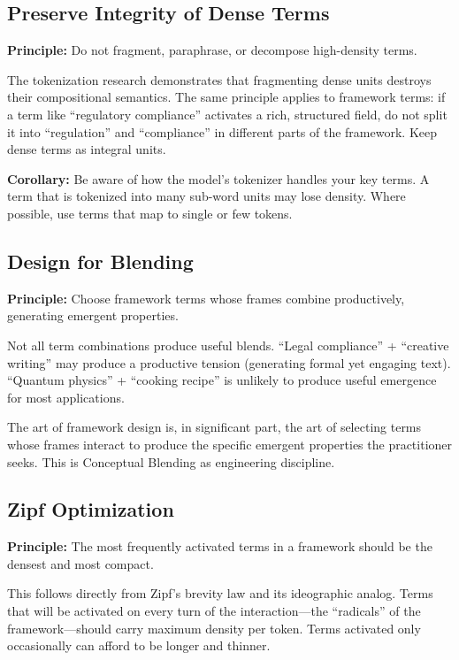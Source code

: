 \documentclass[12pt,a4paper]{article}
\begin{document}
\subsection{Preserve Integrity of Dense Terms}
\label{subsec:integrity}

\textbf{Principle:} Do not fragment, paraphrase, or decompose high-density terms.

The tokenization research \cite{cao2025} demonstrates that fragmenting dense units destroys their compositional semantics.
The same principle applies to framework terms: if a term like ``regulatory compliance'' activates a rich, structured field, do not split it into ``regulation'' and ``compliance'' in different parts of the framework.
Keep dense terms as integral units.

\textbf{Corollary:} Be aware of how the model's tokenizer handles your key terms.
A term that is tokenized into many sub-word units may lose density.
Where possible, use terms that map to single or few tokens.

\subsection{Design for Blending}
\label{subsec:blending-design}

\textbf{Principle:} Choose framework terms whose frames combine productively, generating emergent properties.

Not all term combinations produce useful blends.
``Legal compliance'' + ``creative writing'' may produce a productive tension (generating formal yet engaging text).
``Quantum physics'' + ``cooking recipe'' is unlikely to produce useful emergence for most applications.

The art of framework design is, in significant part, the art of selecting terms whose frames interact to produce the specific emergent properties the practitioner seeks.
This is Conceptual Blending \cite{fauconnier2002} as engineering discipline.

\subsection{Zipf Optimization}
\label{subsec:zipf}

\textbf{Principle:} The most frequently activated terms in a framework should be the densest and most compact.

This follows directly from Zipf's brevity law and its ideographic analog.
Terms that will be activated on every turn of the interaction---the ``radicals'' of the framework---should carry maximum density per token.
Terms activated only occasionally can afford to be longer and thinner.
\end{document}
